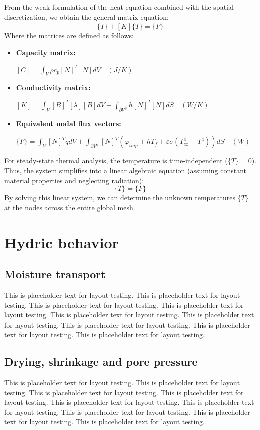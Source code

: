 \documentclass[a4paper,12pt,twoside]{report}     %
\begin{document}
From the weak formulation of the heat equation combined with the spatial discretization, we obtain the general matrix equation:
\begin{equation}
    [C]\{\dot{T}\} + [K]\{T\} = \{F\}
\end{equation}
Where the matrices are defined as follows:
\begin{itemize}
    \item \textbf{Capacity matrix:} 

    $[C] = \int_V \rho c_p [N]^T [N] dV \quad (J/K)$
    \item \textbf{Conductivity matrix:} 

    $[K] = \int_V [B]^T [\lambda] [B] dV + \int_{\partial V^\varphi} h [N]^T [N] dS \quad (W/K)$
    \item \textbf{Equivalent nodal flux vectors:} 

    $\{F\} = \int_V [N]^T q dV + \int_{\partial V^\varphi} [N]^T \left( \varphi_{imp} + hT_f + \varepsilon\sigma(T_\infty^4 - T^4) \right) dS \quad (W)$
\end{itemize}

For steady-state thermal analysis, the temperature is time-independent ($\{\dot{T}\} = 0$). Thus, the system simplifies into a linear algebraic equation (assuming constant material properties and neglecting radiation):
\begin{equation}
    [K]\{T\} = \{F\}
\end{equation}
By solving this linear system, we can determine the unknown temperatures $\{T\}$ at the nodes across the entire global mesh.

\section{Hydric behavior}
\subsection{Moisture transport}
This is placeholder text for layout testing. This is placeholder text for layout testing. This is placeholder text for layout testing. This is placeholder text for layout testing. This is placeholder text for layout testing. This is placeholder text for layout testing. This is placeholder text for layout testing. This is placeholder text for layout testing. This is placeholder text for layout testing.
\subsection{Drying, shrinkage and pore pressure}
This is placeholder text for layout testing. This is placeholder text for layout testing. This is placeholder text for layout testing. This is placeholder text for layout testing. This is placeholder text for layout testing. This is placeholder text for layout testing. This is placeholder text for layout testing. This is placeholder text for layout testing. This is placeholder text for layout testing.
\end{document}
